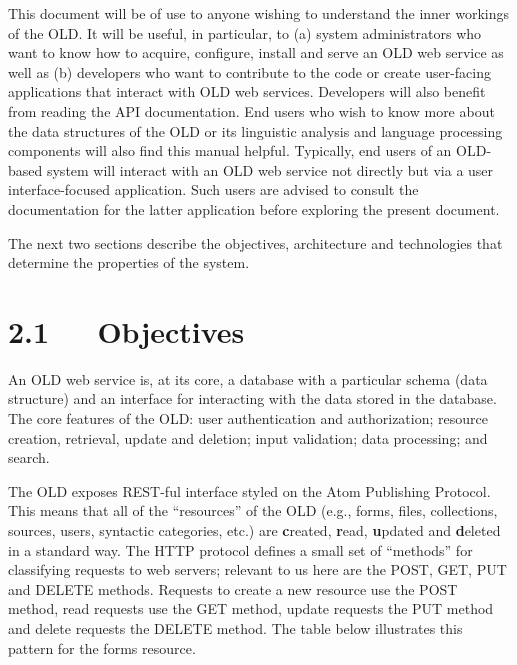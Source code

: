 \documentclass[letterpaper,10pt,english]{sphinxmanual}
\begin{document}
This document will be of use to anyone wishing to understand the inner workings
of the OLD.  It will be useful, in particular, to (a) system administrators who
want to know how to acquire, configure, install and serve an OLD web service as
well as (b) developers who want to contribute to the code or create user-facing
applications that interact with OLD web services.  Developers will also benefit
from reading the API documentation.  End users who wish to know more about
the data structures of the OLD or its linguistic analysis and language
processing components will also find this manual helpful.  Typically, end users
of an OLD-based system will interact with an OLD web service not directly but
via a user interface-focused application.  Such users are advised to consult the
documentation for the latter application before exploring the present document.

The next two sections describe the objectives, architecture and technologies
that determine the properties of the system.


\section{2.1   Objectives}
\label{documentation:objectives}
An OLD web service is, at its core, a database with a particular schema (data
structure) and an interface for interacting with the data stored in the database.
The core features of the OLD: user authentication and authorization; resource
creation, retrieval, update and deletion; input validation; data processing; and
search.

The OLD exposes REST-ful interface styled on the Atom Publishing Protocol.  This
means that all of the ``resources'' of the OLD (e.g., forms, files, collections,
sources, users, syntactic categories, etc.) are \textbf{c}reated, \textbf{r}ead,
\textbf{u}pdated and \textbf{d}eleted in a standard way.  The HTTP protocol defines a
small set of ``methods'' for classifying requests to web servers; relevant to us
here are the POST, GET, PUT and DELETE methods.  Requests to create a new
resource use the POST method, read requests use the GET method, update requests
the PUT method and delete requests the DELETE method.  The table below
illustrates this pattern for the forms resource.
\end{document}
